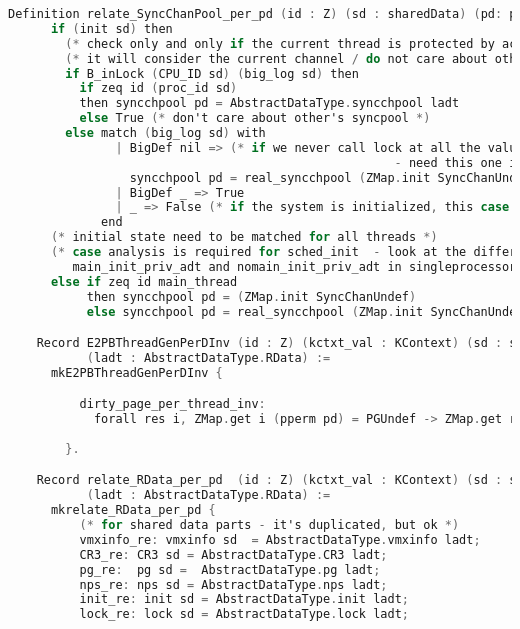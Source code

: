 \begin{lstlisting}[language=C]
    Definition relate_SyncChanPool_per_pd (id : Z) (sd : sharedData) (pd: privData) (ladt : AbstractDataType.RData) :=
      if (init sd) then 
        (* check only and only if the current thread is protected by acquire_lock *)
        (* it will consider the current channel / do not care about other channels *)
        if B_inLock (CPU_ID sd) (big_log sd) then 
          if zeq id (proc_id sd) 
          then syncchpool pd = AbstractDataType.syncchpool ladt
          else True (* don't care about other's syncpool *) 
        else match (big_log sd) with 
               | BigDef nil => (* if we never call lock at all the value should be initialized value
                                                      - need this one in sched_init function proof *)
                 syncchpool pd = real_syncchpool (ZMap.init SyncChanUndef)
               | BigDef _ => True
               | _ => False (* if the system is initialized, this case should not happen *)
             end
      (* initial state need to be matched for all threads *)
      (* case analysis is required for sched_init  - look at the difference between 
         main_init_priv_adt and nomain_init_priv_adt in singleprocessor/AuxSingleAbstractData.v file *)
      else if zeq id main_thread  
           then syncchpool pd = (ZMap.init SyncChanUndef)
           else syncchpool pd = real_syncchpool (ZMap.init SyncChanUndef).

    Record E2PBThreadGenPerDInv (id : Z) (kctxt_val : KContext) (sd : sharedData) (pd : privData)
           (ladt : AbstractDataType.RData) :=
      mkE2PBThreadGenPerDInv {

          dirty_page_per_thread_inv:
            forall res i, ZMap.get i (pperm pd) = PGUndef -> ZMap.get res (HP pd) = ZMap.get res (FlatMem.free_page i (HP pd))
          
        }.

    Record relate_RData_per_pd  (id : Z) (kctxt_val : KContext) (sd : sharedData) (pd : privData)
           (ladt : AbstractDataType.RData) :=
      mkrelate_RData_per_pd {
          (* for shared data parts - it's duplicated, but ok *)
          vmxinfo_re: vmxinfo sd  = AbstractDataType.vmxinfo ladt;
          CR3_re: CR3 sd = AbstractDataType.CR3 ladt;
          pg_re:  pg sd =  AbstractDataType.pg ladt;
          nps_re: nps sd = AbstractDataType.nps ladt;
          init_re: init sd = AbstractDataType.init ladt;
          lock_re: lock sd = AbstractDataType.lock ladt;
          

\end{lstlisting}
